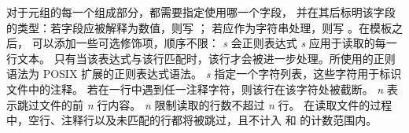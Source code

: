 \noindent 对于元组的每一个组成部分，都需要指定使用哪一个字段，
并在其后标明该字段的类型：若字段应被解释为数值，则写 ；
若应作为字符串处理，则写 。在模板之后，
可以添加一些可选修饰项，顺序不限：
 \emph{s} 会正则表达式 \emph{s} 应用于读取的每一行文本。
只有当该表达式与该行匹配时，该行才会被进一步处理。所使用的正则语法为 
POSIX 扩展的正则表达式语法。
 \emph{s} 指定一个字符列表，这些字符用于标识文件中的注释。
若在一行中遇到任一注释字符，则该行在该字符处被截断。
 \emph{n} 表示跳过文件的前 \emph{n} 行内容。
 \emph{n} 限制读取的行数不超过 \emph{n} 行。
在读取文件的过程中，空行、注释行以及未匹配的行都将被跳过，且不计入
 和  的计数范围内。

